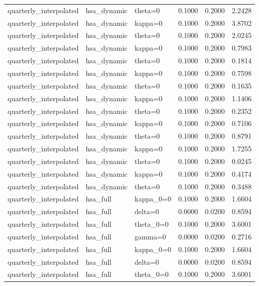 \begin{tabular}{lllrrr}
quarterly\_interpolated & hsa\_dynamic & theta=0 & 0.1000 & 0.2000 & 2.2428 \\
quarterly\_interpolated & hsa\_dynamic & kappa=0 & 0.1000 & 0.2000 & 3.8702 \\
quarterly\_interpolated & hsa\_dynamic & theta=0 & 0.1000 & 0.2000 & 2.0245 \\
quarterly\_interpolated & hsa\_dynamic & kappa=0 & 0.1000 & 0.2000 & 0.7983 \\
quarterly\_interpolated & hsa\_dynamic & theta=0 & 0.1000 & 0.2000 & 0.1814 \\
quarterly\_interpolated & hsa\_dynamic & kappa=0 & 0.1000 & 0.2000 & 0.7598 \\
quarterly\_interpolated & hsa\_dynamic & theta=0 & 0.1000 & 0.2000 & 0.1635 \\
quarterly\_interpolated & hsa\_dynamic & kappa=0 & 0.1000 & 0.2000 & 1.1406 \\
quarterly\_interpolated & hsa\_dynamic & theta=0 & 0.1000 & 0.2000 & 0.2352 \\
quarterly\_interpolated & hsa\_dynamic & kappa=0 & 0.1000 & 0.2000 & 0.7106 \\
quarterly\_interpolated & hsa\_dynamic & theta=0 & 0.1000 & 0.2000 & 0.8791 \\
quarterly\_interpolated & hsa\_dynamic & kappa=0 & 0.1000 & 0.2000 & 1.7255 \\
quarterly\_interpolated & hsa\_dynamic & theta=0 & 0.1000 & 0.2000 & 0.0245 \\
quarterly\_interpolated & hsa\_dynamic & kappa=0 & 0.1000 & 0.2000 & 0.4174 \\
quarterly\_interpolated & hsa\_dynamic & theta=0 & 0.1000 & 0.2000 & 0.3488 \\
quarterly\_interpolated & hsa\_full & kappa\_0=0 & 0.1000 & 0.2000 & 1.6604 \\
quarterly\_interpolated & hsa\_full & delta=0 & 0.0000 & 0.0200 & 0.8594 \\
quarterly\_interpolated & hsa\_full & theta\_0=0 & 0.1000 & 0.2000 & 3.6001 \\
quarterly\_interpolated & hsa\_full & gamma=0 & 0.0000 & 0.0200 & 0.2716 \\
quarterly\_interpolated & hsa\_full & kappa\_0=0 & 0.1000 & 0.2000 & 1.6604 \\
quarterly\_interpolated & hsa\_full & delta=0 & 0.0000 & 0.0200 & 0.8594 \\
quarterly\_interpolated & hsa\_full & theta\_0=0 & 0.1000 & 0.2000 & 3.6001 \\

\end{tabular}
